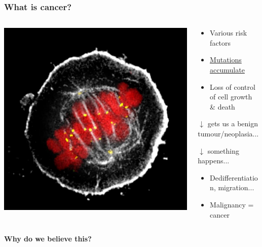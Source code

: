 \documentclass{beamer}
\begin{document}
\begin{frame}
    \frametitle{What is cancer?}
    \begin{columns}
        \begin{column}{0.5\textwidth}
        \includegraphics[width=\textwidth]{figures/HeLaCell_wellcometrust.jpg}
        \end{column}
        \begin{column}{0.5\textwidth}
            \begin{itemize}
            \item Various risk factors
            \item \underline{Mutations accumulate}
            \item Loss of control of cell growth \& death
            \end{itemize}
            \begin{center}
            $\downarrow$ gets us a benign tumour/neoplasia...
            \end{center}
            \begin{center}
            $\downarrow$ something happens...
            \end{center}
            \begin{itemize}
            \item Dedifferentiation, migration...
            \item Malignancy = cancer
            \end{itemize}
        \end{column}
    \end{columns}
    \;
    \begin{center}
    \vphantom{$\sum$}\textbf{Why do we believe this?}
    \end{center}

\end{frame}
\end{document}
